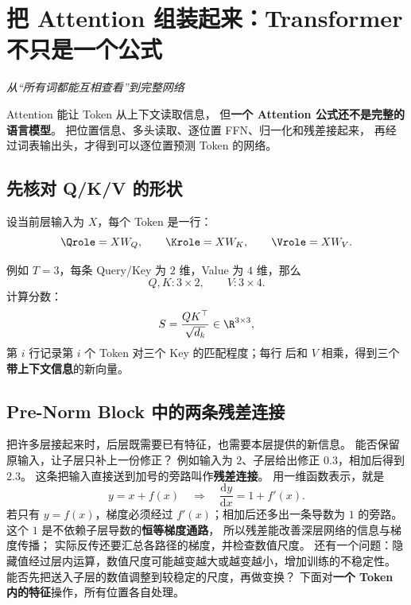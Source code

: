 \chapterrule
\section{把 Attention 组装起来：Transformer 不只是一个公式}
\label{intro:22-transformer-architecture}

\begin{idea}
\noindent\emph{从“所有词都能互相查看”到完整网络}\par

Attention 能让 Token 从上下文读取信息，
但\textbf{一个 Attention 公式还不是完整的语言模型}。
把位置信息、多头读取、逐位置 FFN、归一化和残差接起来，
再经过词表输出头，才得到可以逐位置预测 Token 的网络。
\end{idea}

\subsection{先核对 Q/K/V 的形状}

设当前层输入为 $X$，每个 Token 是一行：
\[
\Qrole=XW_Q,\qquad \Krole=XW_K,\qquad \Vrole=XW_V.
\]
\begin{center}\QKVlegend\end{center}
例如 $T=3$，每条 Query/Key 为 $2$ 维，Value 为 $4$ 维，那么
\[
Q,K:3\times2,\qquad V:3\times4.
\]
计算分数：
\[
S=\frac{QK^\top}{\sqrt{d_k}}\in\R^{3\times3},
\]
第 $i$ 行记录第 $i$ 个 Token 对三个 Key 的匹配程度；每行  后和 $V$ 相乘，得到三个\textbf{带上下文信息}的新向量。

\subsection{Pre-Norm Block 中的两条残差连接}

把许多层接起来时，后层既需要已有特征，也需要本层提供的新信息。
能否保留原输入，让子层只补上一份修正？
例如输入为 $2$、子层给出修正 $0.3$，相加后得到 $2.3$。
\label{concept:residual}%
这条把输入直接送到加号的旁路叫作\textbf{残差连接}。
用一维函数表示，就是
\[
y=x+f(x)\quad\Longrightarrow\quad
\frac{\mathrm dy}{\mathrm dx}=1+f'(x).
\]
若只有 $y=f(x)$，梯度必须经过 $f'(x)$；相加后还多出一条导数为 $1$ 的旁路。
这个 $1$ 是不依赖子层导数的\textbf{恒等梯度通路}，
所以残差能改善深层网络的信息与梯度传播；
实际反传还要汇总各路径的梯度，并检查数值尺度。
还有一个问题：隐藏值经过层内运算，数值尺度可能越变越大或越变越小，增加训练的不稳定性。
能否先把送入子层的数值调整到较稳定的尺度，再做变换？
下面对\textbf{一个 Token 内的特征}操作，所有位置各自处理。

